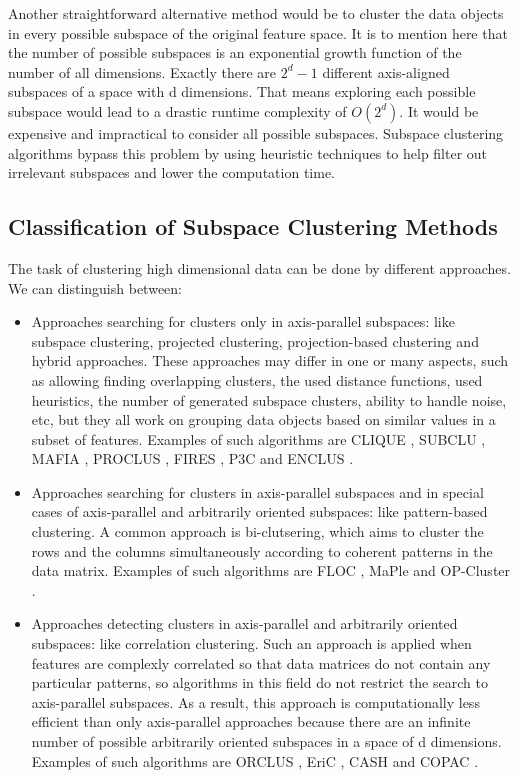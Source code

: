 Another straightforward alternative method would be to cluster the data objects in every possible subspace of the original feature space. It is to mention here that the number of possible subspaces is an exponential growth function of the number of all dimensions. Exactly there are $2^{d}-1$ different axis-aligned subspaces of a space with d dimensions. That means exploring each possible subspace would lead to a drastic runtime complexity of $O(2^{d})$. It would be expensive and impractical to consider all possible subspaces. Subspace clustering algorithms bypass this problem by using heuristic techniques to help filter out irrelevant subspaces and lower the computation time. 

\subsection{Classification of Subspace Clustering Methods} The task of clustering high dimensional data can be done by different approaches. We can distinguish between:
\begin{itemize}
\item Approaches searching for clusters only in axis-parallel subspaces: like subspace clustering, projected clustering, projection-based clustering and hybrid approaches. These approaches may differ in one or many aspects, such as allowing finding overlapping clusters, the used distance functions, used heuristics, the number of generated subspace clusters, ability to handle noise, etc, but they all work on grouping data objects based on similar values in a subset of features. Examples of such algorithms are CLIQUE \citep{10.1145/276305.276314}, SUBCLU \citep{subclu}, MAFIA \citep{DBLP:conf/sdm/NageshGC01} , PROCLUS \citep{10.1145/304181.304188}, FIRES \citep{fires} , P3C \citep{4053068} and ENCLUS \citep{10.1145/312129.312199}.

\item Approaches searching for clusters in axis-parallel subspaces and in special cases of axis-parallel and arbitrarily oriented subspaces: like pattern-based clustering. A common approach is bi-clutsering, which aims to cluster the rows and the columns simultaneously according to coherent patterns in the data matrix. Examples of such algorithms are FLOC \citep{10.1109/ICDE.2002.994771}, MaPle \citep{10.1109/ICDM.2003.1250928} and OP-Cluster \citep{10.1109/ICDM.2003.1250919}.

\item Approaches detecting clusters in axis-parallel and arbitrarily oriented subspaces: like correlation clustering. Such an approach is applied when features are complexly correlated so that data matrices do not contain any particular patterns, so algorithms in this field do not restrict the search to axis-parallel subspaces. As a result, this approach is computationally less efficient than only axis-parallel approaches because there are an infinite number of possible arbitrarily oriented subspaces in a space of d dimensions. Examples of such algorithms are ORCLUS \citep{10.1145/342009.335383}, EriC \citep{DBLP:conf/ssdbm/AchtertBKKZ07}, CASH \citep{DBLP:conf/sdm/AchtertBDKZ08} and COPAC \citep{DBLP:conf/sdm/AchtertBKKZ07}.
\end{itemize}
